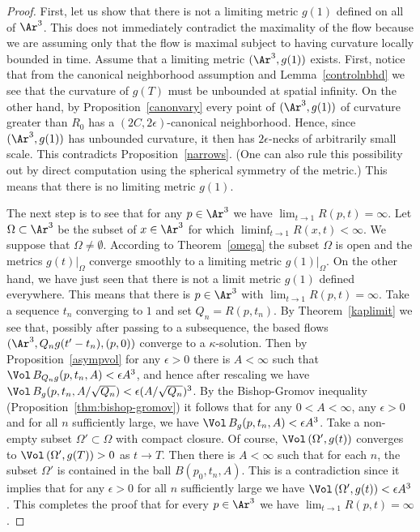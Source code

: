 \begin{proof}
First, let us show that there is not a limiting metric $g(1)$
defined on all of $\Ar^3$. This does not immediately contradict the
maximality of the flow because we are assuming only that the flow is
maximal subject to having curvature locally bounded in time. Assume
that a limiting metric $(\Ar^3,g(1))$ exists.
 First,
notice that from the canonical neighborhood assumption and
Lemma~\ref{controlnbhd} we see that the curvature of $g(T)$ must be
unbounded at spatial infinity. On the other hand, by
Proposition~\ref{canonvary} every point of $(\Ar^3,g(1))$ of
curvature greater than $R_0$ has a $(2C,2\epsilon)$-canonical
neighborhood. Hence, since $(\Ar^3,g(1))$ has unbounded curvature,
it then has $2\epsilon$-necks of arbitrarily small scale. This
contradicts Proposition~\ref{narrows}. (One can also rule this
possibility out by direct computation using the spherical symmetry
of the metric.) This means that there is no limiting metric $g(1)$.



The next step is to see that for any $p\in \Ar^3$ we have $\lim_{t\rightarrow 1}R(p,t)=\infty$. Let $\Omega\subset \Ar^3$ be
the subset of $x\in \Ar^3$ for which $\liminf_{t\rightarrow
1}R(x,t)<\infty$. We suppose that $\Omega\not=\emptyset$. According
to Theorem~\ref{omega} the subset $\Omega$ is open and the metrics
$g(t)|_\Omega$ converge smoothly to a limiting metric
$g(1)|_\Omega$. On the other hand, we have just seen that there is
not a limit metric $g(1)$ defined everywhere. This means that there
is $p\in \Ar^3$ with  $\lim_{t\rightarrow 1}R(p,t)=\infty$.
Take a sequence $t_n$ converging to $1$ and set $Q_n=R(p,t_n)$. By
Theorem~\ref{kaplimit} we see that, possibly after passing to a
subsequence, the based flows $(\Ar^3,Q_ng(t'-t_n),(p,0))$ converge
to a $\kappa$-solution. Then by Proposition~\ref{asympvol} for any
$\epsilon>0$ there is $A<\infty$ such that $\Vol\,B_{Q_ng}(p,t_n,A)<\epsilon A^3$, and hence after rescaling we
have $\Vol\,B_g(p,t_n,A/\sqrt{Q_n})<\epsilon (A/\sqrt{Q_n})^3$.
By the Bishop-Gromov inequality (Proposition~\ref{thm:bishop-gromov}) it
follows that for any $0<A<\infty$, any $\epsilon>0$ and for all $n$
sufficiently large, we have $\Vol\,B_g(p,t_n,A)<\epsilon A^3$.
Take a non-empty subset $\Omega'\subset \Omega$ with compact
closure. Of course, $\Vol\,(\Omega',g(t))$ converges to $\Vol\,(\Omega',g(T))>0$ as $t\rightarrow T$. Then there is
$A<\infty$ such that for each $n$, the subset $\Omega'$ is contained
in the ball $B(p_0,t_n,A)$. This is a contradiction since it implies
that for any $\epsilon>0$ for all $n$ sufficiently large we have
$\Vol\,(\Omega',g(t))<\epsilon A^3$. This completes the proof
that for every $p\in \Ar^3$ we have $\lim_{t\rightarrow
1}R(p,t)=\infty$.


\end{proof}
